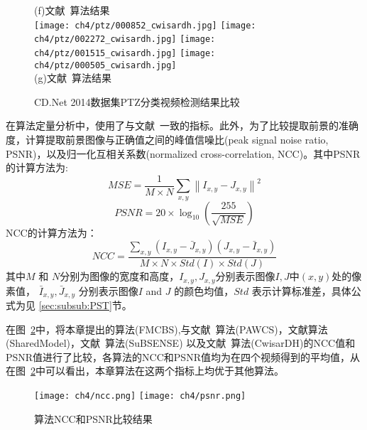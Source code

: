 \begin{figure}[htbp]
  (f)文献~算法结果\\
  \texttt{[image: ch4/ptz/000852\_cwisardh.jpg]}
  \texttt{[image: ch4/ptz/002272\_cwisardh.jpg]}
  \texttt{[image: ch4/ptz/001515\_cwisardh.jpg]}
  \texttt{[image: ch4/ptz/000505\_cwisardh.jpg]}\\
  (g)文献~算法结果\\
  \caption{CD.Net 2014数据集\cite{CD2014}PTZ分类视频检测结果比较}\label{ch4:fig:ptzResults}
\end{figure} \par

在算法定量分析中，使用了与文献~\cite{CD2014}一致的指标。此外，为了比较提取前景的准确度，计算提取前景图像与正确值之间的峰值信噪比(peak signal noise ratio, PSNR)，以及归一化互相关系数(normalized cross-correlation, NCC)。其中PSNR的计算方法为:
 $$MSE=\frac{1}{M\times N}\sum_{x,y}\left \| I_{x,y}-J_{x,y} \right \|^{2}$$
 $$ PSNR = 20\times \log_{10}\left ( \frac{255}{\sqrt{MSE}}\right )$$
 NCC的计算方法为：
$$NCC=\frac{\sum_{x,y}\left( I_{x,y}-\bar J_{x,y}\right )\left(J_{x,y}- \bar I_{x,y} \right )}{M\times N\times Std(I) \times Std(J)}$$
 其中$M$ 和 $N$分别为图像的宽度和高度，$I_{x,y},J_{x,y}$分别表示图像$I,J$中$(x,y)$处的像素值， $\bar I_{x,y},\bar J_{x,y}$ 分别表示图像$I$ and $J$ 的颜色均值，$Std$ 表示计算标准差，具体公式为见 \ref{sec:subsub:PST}节。\par
 在图~\ref{ch4:fig:nccPSNR}中，将本章提出的算法(FMCBS),与文献~算法(PAWCS)，文献算法(SharedModel)，文献~算法(SuBSENSE) 以及文献~算法(CwisarDH)的NCC值和PSNR值进行了比较，各算法的NCC和PSNR值均为在四个视频得到的平均值，从在图~\ref{ch4:fig:nccPSNR}中可以看出，本章算法在这两个指标上均优于其他算法。
\begin{figure}[htb]
  \centering%
    {\texttt{[image: ch4/ncc.png]}}%
 \hspace{1em}%
      {\texttt{[image: ch4/psnr.png]}}

  \caption{算法NCC和PSNR比较结果}
  \label{ch4:fig:nccPSNR}
\end{figure}



